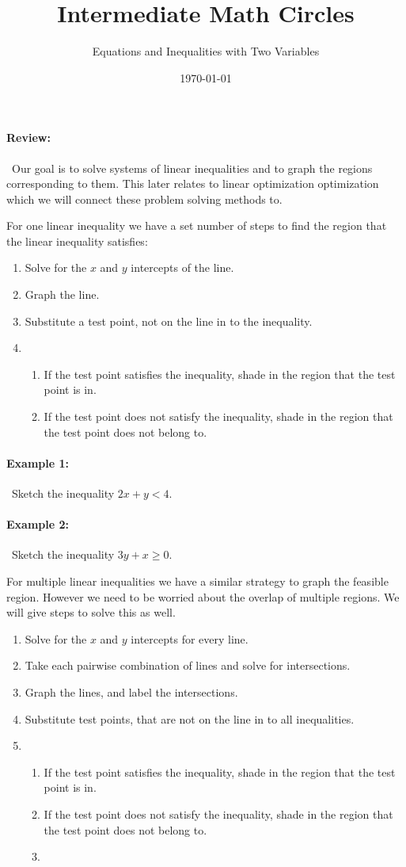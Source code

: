 \documentclass[english,12pt]{article}
\title{Intermediate Math Circles}
\author{Equations and Inequalities with Two Variables}
\date{\today}
\theoremstyle{plain}
\theoremstyle{definition}
\theoremstyle{definition} %
\newcommand{\enum}[1]{\begin{enumerate} #1 \end{enumerate}}
\begin{document}
  \maketitle 

\paragraph{Review:}\
Our goal is to solve systems of linear inequalities and to graph the regions corresponding to them.  This later relates to linear optimization optimization which we will connect these problem solving methods to.

For one linear inequality we have a set number of steps to find the region that the linear inequality satisfies:
\enum{
\item Solve for the $x$ and $y$ intercepts of the line.
\item Graph the line.
\item Substitute a test point, not on the line in to the inequality.
\item 
\enum {
\item If the test point satisfies the inequality, shade in the region that the test point is in.
\item If the test point does not satisfy the inequality, shade in the region that the test point does not belong to.
}
}
\paragraph{Example 1:}\
Sketch the inequality $2x + y < 4$.

\paragraph{Example 2:}\
Sketch the inequality $3y + x \ge 0$.

For multiple linear inequalities we have a similar strategy to graph the feasible region.  However we need to be worried about the overlap of multiple regions.  We will give steps to solve this as well.
\enum{
\item Solve for the $x$ and $y$ intercepts for every line.
\item Take each pairwise combination of lines and solve for intersections.
\item Graph the lines, and label the intersections.
\item Substitute test points, that are not on the line in to all inequalities.
\item
\enum {
\item If the test point satisfies the inequality, shade in the region that the test point is in.
\item If the test point does not satisfy the inequality, shade in the region that the test point does not belong to.
\item 
}
}
\end{document}

